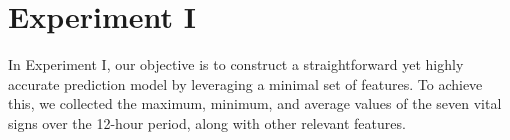 \documentclass[12pt,a4paper,english
]{tunithesis}
\begin{document}

\section{Experiment I}

In Experiment I, our objective is to construct a straightforward yet highly accurate prediction model by leveraging a minimal set of features. To achieve this, we collected the maximum, minimum, and average values of the seven vital signs over the 12-hour period, along with other relevant features.
\end{document}

